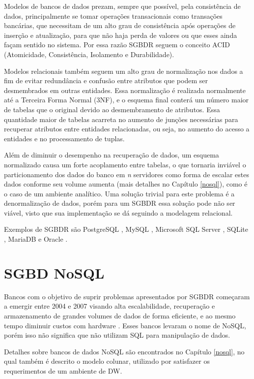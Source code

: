 Modelos de bancos de dados prezam, sempre que possível, pela consistência de dados, principalmente se tomar operações transacionais como transações bancárias, que necessitam de um alto grau de consistência após operações de inserção e atualização, para que não haja perda de valores ou que esses ainda façam sentido no sistema. Por essa razão SGBDR seguem o conceito ACID (Atomicidade, Consistência, Isolamento e Durabilidade). 

Modelos relacionais também seguem um alto grau de normalização nos dados a fim de evitar redundância e confusão entre atributos que podem ser desmembrados em outras entidades. Essa normalização é realizada normalmente até a Terceira Forma Normal (3NF), e o esquema final conterá um número maior de tabelas que o original devido ao desmembramento de atributos. Essa quantidade maior de tabelas acarreta no aumento de junções necessárias para recuperar atributos entre entidades relacionadas, ou seja, no aumento do acesso a entidades e no processamento de tuplas.

Além de diminuir o desempenho na recuperação de dados, um esquema normalizado causa um forte acoplamento entre tabelas, o que tornaria inviável o particionamento dos dados do banco em \textit{n} servidores como forma de escalar estes dados conforme seu volume aumenta (mais detalhes no Capítulo \ref{nosql}), como é o caso de um ambiente analítico. Uma solução trivial para este problema é a denormalização de dados, porém para um SGBDR essa solução pode não ser viável, visto que sua implementação se dá seguindo a modelagem relacional.

Exemplos de SGBDR são PostgreSQL \cite{postgres2018r}, MySQL \cite{mysql2018r}, Microsoft SQL Server \cite{microsoft2018r}, SQLite \cite{lite2018r}, MariaDB \cite{maria2018r} e Oracle \cite{oracle2018r}. 

\section{SGBD NoSQL}

Bancos com o objetivo de suprir problemas apresentados por SGBDR começaram a emergir entre 2004 e 2007 visando alta escalabilidade, recuperação e armazenamento de grandes volumes de dados de forma eficiente, e ao mesmo tempo diminuir custos com hardware \cite{han2011nosql}. Esses bancos levaram o nome de NoSQL, porém isso não significa que não utilizam SQL para manipulação de dados.

Detalhes sobre bancos de dados NoSQL são encontrados no Capítulo \ref{nosql}, no qual também é descrito o modelo colunar, utilizado por satisfazer os requerimentos de um ambiente de DW.